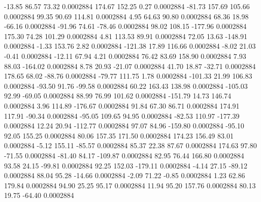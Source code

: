       -13.85       86.57       73.32     0.0002884
      174.67      152.25        0.27     0.0002884
      -81.73      157.69      105.66     0.0002884
       99.35       90.69      114.81     0.0002884
        4.95       64.63       90.80     0.0002884
       68.36       18.98      -66.16     0.0002884
      -91.96       74.61      -78.46     0.0002884
       98.02      108.15     -177.96     0.0002884
      175.30       74.28      101.29     0.0002884
        4.81      113.53       89.91     0.0002884
       72.05       13.63     -148.91     0.0002884
       -1.33      153.76        2.82     0.0002884
     -121.38       17.89      116.66     0.0002884
       -8.02       21.03       -0.41     0.0002884
      -12.11       67.94        4.21     0.0002884
       76.42       83.69      158.90     0.0002884
        7.93       88.03     -164.02     0.0002884
        8.78       20.93      -21.07     0.0002884
       41.70       18.87      -32.71     0.0002884
      178.65       68.02      -88.76     0.0002884
      -79.77      111.75        1.78     0.0002884
     -101.33       21.99      106.83     0.0002884
      -93.50       91.76      -99.58     0.0002884
       60.22      163.43      138.98     0.0002884
     -105.03       92.99      -69.05     0.0002884
       88.99       76.99      101.62     0.0002884
     -151.79       14.73      146.74     0.0002884
        3.96      114.89     -176.67     0.0002884
       91.84       67.30       86.71     0.0002884
      174.91      117.91      -90.34     0.0002884
      -95.05      109.65       94.95     0.0002884
      -82.53      110.97     -177.39     0.0002884
       12.24       20.94     -112.77     0.0002884
       97.07       84.96     -159.80     0.0002884
      -95.10       92.05      155.25     0.0002884
       80.06      157.35      171.50     0.0002884
      174.23      156.49       83.01     0.0002884
       -5.12      155.11      -85.57     0.0002884
       85.37       22.38       87.67     0.0002884
      174.63       97.80      -71.55     0.0002884
      -81.40       84.17     -109.87     0.0002884
       82.95       76.44      166.80     0.0002884
       93.58       24.15      -99.81     0.0002884
       92.25      152.03     -179.11     0.0002884
       -4.14       27.15      -89.12     0.0002884
       88.04       95.28      -14.66     0.0002884
       -2.09       71.22       -0.85     0.0002884
        1.23       62.86      179.84     0.0002884
       94.90       25.25       95.17     0.0002884
       11.94       95.20      157.76     0.0002884
       80.13       19.75      -64.40     0.0002884

